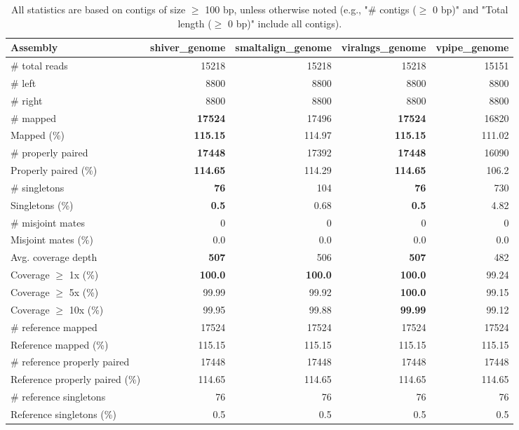 \documentclass[12pt,a4paper]{article}
\begin{document}
\begin{table}[ht]
\begin{center}
\caption{All statistics are based on contigs of size $\geq$ 100 bp, unless otherwise noted (e.g., "\# contigs ($\geq$ 0 bp)" and "Total length ($\geq$ 0 bp)" include all contigs).}
\begin{tabular}{|l*{4}{|r}|}
\hline
Assembly & shiver\_genome & smaltalign\_genome & viralngs\_genome & vpipe\_genome \\ \hline
\# total reads & 15218 & 15218 & 15218 & 15151 \\ \hline
\# left & 8800 & 8800 & 8800 & 8800 \\ \hline
\# right & 8800 & 8800 & 8800 & 8800 \\ \hline
\# mapped & {\bf 17524} & 17496 & {\bf 17524} & 16820 \\ \hline
Mapped (\%) & {\bf 115.15} & 114.97 & {\bf 115.15} & 111.02 \\ \hline
\# properly paired & {\bf 17448} & 17392 & {\bf 17448} & 16090 \\ \hline
Properly paired (\%) & {\bf 114.65} & 114.29 & {\bf 114.65} & 106.2 \\ \hline
\# singletons & {\bf 76} & 104 & {\bf 76} & 730 \\ \hline
Singletons (\%) & {\bf 0.5} & 0.68 & {\bf 0.5} & 4.82 \\ \hline
\# misjoint mates & 0 & 0 & 0 & 0 \\ \hline
Misjoint mates (\%) & 0.0 & 0.0 & 0.0 & 0.0 \\ \hline
Avg. coverage depth & {\bf 507} & 506 & {\bf 507} & 482 \\ \hline
Coverage $\geq$ 1x (\%) & {\bf 100.0} & {\bf 100.0} & {\bf 100.0} & 99.24 \\ \hline
Coverage $\geq$ 5x (\%) & 99.99 & 99.92 & {\bf 100.0} & 99.15 \\ \hline
Coverage $\geq$ 10x (\%) & 99.95 & 99.88 & {\bf 99.99} & 99.12 \\ \hline
\# reference mapped & 17524 & 17524 & 17524 & 17524 \\ \hline
Reference mapped (\%) & 115.15 & 115.15 & 115.15 & 115.15 \\ \hline
\# reference properly paired & 17448 & 17448 & 17448 & 17448 \\ \hline
Reference properly paired (\%) & 114.65 & 114.65 & 114.65 & 114.65 \\ \hline
\# reference singletons & 76 & 76 & 76 & 76 \\ \hline
Reference singletons (\%) & 0.5 & 0.5 & 0.5 & 0.5 \\ \hline

\end{tabular}
\end{center}
\end{table}
\end{document}
